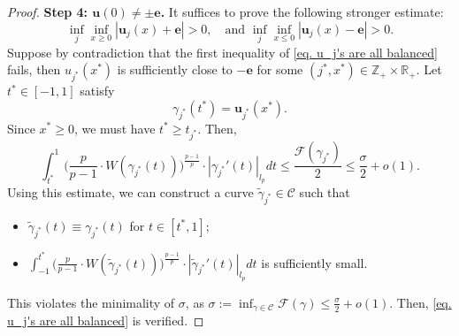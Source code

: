 \documentclass[11pt,twoside,reqno]{amsart}
\numberwithin{equation}{section}
\begin{document}
\begin{proof}
    \textbf{Step 4: $\mathbf{u}(0)\neq\pm\mathbf{e}$.} It suffices to prove the following stronger estimate:
    \begin{equation}\label{eq. u_j's are all balanced}
        \inf_{j}\inf_{x\geq0}|\mathbf{u}_{j}(x)+\mathbf{e}|>0,\quad\mbox{and }\inf_{j}\inf_{x\leq0}|\mathbf{u}_{j}(x)-\mathbf{e}|>0.
    \end{equation}
    Suppose by contradiction that the first inequality of \eqref{eq. u_j's are all balanced} fails, then $u_{j^{*}}(x^{*})$ is sufficiently close to $-\mathbf{e}$ for some $(j^{*},x^{*})\in\mathbb{Z}_{+}\times\mathbb{R}_{+}$. Let $t^{*}\in[-1,1]$ satisfy 
    $$\gamma_{j^{*}}(t^{*})=\mathbf{u}_{j^{*}}(x^{*}).$$ Since $x^{*}\geq0$, we must have $t^{*}\geq t_{j^{*}}$. Then,
    \begin{equation*}
        \int_{t^{*}}^{1}\Big(\frac{p}{p-1}\cdot W(\gamma_{j^{*}}(t))\Big)^{\frac{p-1}{p}}\cdot|\gamma_{j^{*}}'(t)|_{l_{p}}dt\leq\frac{\mathcal{F}(\gamma_{j^{*}})}{2}\leq\frac{\sigma}{2}+o(1).
    \end{equation*}
    Using this estimate, we can construct a curve $\widetilde{\gamma}_{j^*}\in\mathcal{C}$ such that
    \begin{itemize}
        \item $\widetilde{\gamma}_{j^{*}}(t)\equiv\gamma_{j^{*}}(t)$ for $t\in[t^{*},1]$;
        \item $\displaystyle\int_{-1}^{t^{*}}\Big(\frac{p}{p-1}\cdot W(\widetilde{\gamma}_{j^{*}}(t))\Big)^{\frac{p-1}{p}}\cdot|\widetilde{\gamma}_{j^{*}}'(t)|_{l_{p}}dt$ is sufficiently small.
    \end{itemize}
    This violates the minimality of $\sigma$, as $\displaystyle\sigma:=\inf_{\gamma\in\mathcal{C}}\mathcal{F}(\gamma)\leq\frac{\sigma}{2}+o(1)$. Then, \eqref{eq. u_j's are all balanced} is verified.


\end{proof}
\end{document}
